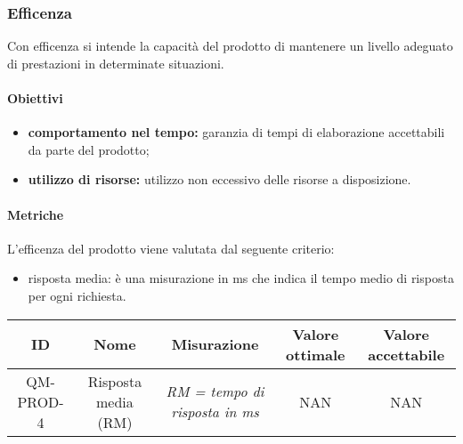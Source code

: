 \subsubsection{Efficenza}
Con efficenza si intende la capacità del prodotto di mantenere un livello adeguato di prestazioni in determinate situazioni.
	\paragraph{Obiettivi}
		\begin{itemize}
			\item \textbf{comportamento nel tempo:} garanzia di tempi di elaborazione accettabili da parte del prodotto;
			\item \textbf{utilizzo di risorse:} utilizzo non eccessivo delle risorse a disposizione.
		\end{itemize}
	\paragraph{Metriche}
	L'efficenza del prodotto viene valutata dal seguente criterio:
	\begin{itemize}
		\item risposta media: è una misurazione in ms che indica il tempo medio di risposta per ogni richiesta.
	\end{itemize}
	\begin{center}
		\begin{tabular}{|c|c|c|c|c|}
			\hline
			ID & Nome & Misurazione & Valore ottimale & Valore accettabile \\
			\hline
			QM-PROD-4 & Risposta media (RM) & \textit{RM = tempo di risposta in ms} & NAN & NAN \\
			\hline
		\end{tabular}
	\end{center}
